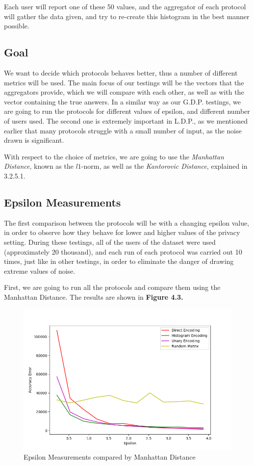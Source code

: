 Each user will report one of these 50 values, and the aggregator of each protocol will gather the data given, and try to re-create this histogram in the best manner possible.

\subsection{Goal}

We want to decide which protocols behaves better, thus a number of different metrics will be used. The main focus of our testings will be the vectors that the aggregators provide, which we will compare with each other, as well as with the vector containing the true answers. In a similar way as our G.D.P. testings, we are going to run the protocols for different values of epsilon, and different number of users used. The second one is extremely important in L.D.P., as we mentioned earlier that many protocols struggle with a small number of input, as the noise drawn is significant. 

With respect to the choice of metrics, we are going to use the \emph{Manhattan Distance}, known as the $l1$-norm, as well as the \emph{Kantorovic Distance}, explained in 3.2.5.1.

\subsection{Epsilon Measurements}

The first comparison between the protocols will be with a changing epsilon value, in order to observe how they behave for lower and higher values of the privacy setting. During these testings, all of the users of the dataset were used (approximately 20 thousand), and each run of each protocol was carried out 10 times, just like in other testings, in order to eliminate the danger of drawing extreme values of noise.

First, we are going to run all the protocols and compare them using the Manhattan Distance. The results are shown in \textbf{Figure 4.3.}


\begin{figure}[!htb]\centering
    \includegraphics[width=1\textwidth]{images/epsilon_others_l1.png}
    \caption{Epsilon Measurements compared by Manhattan Distance}
\end{figure}


